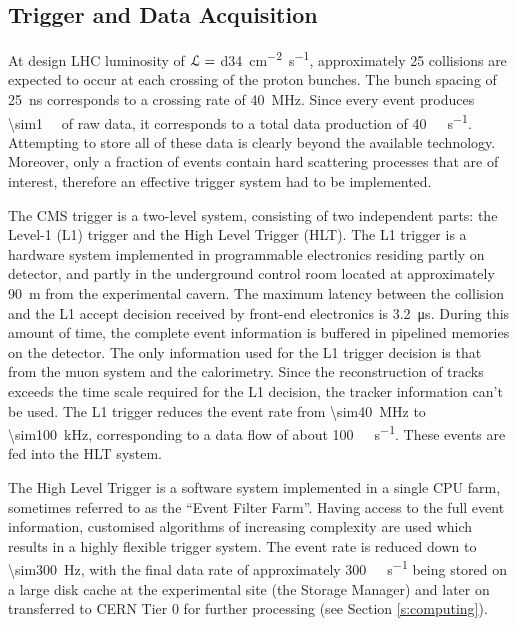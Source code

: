 \subsection{Trigger and Data Acquisition}
\label{ss:trigger_daq}
At design LHC luminosity of $\mathcal{L} = $ \SI{d34}{\cm^{-2} s^{-1}}, approximately \num{25} collisions are expected to
occur at each crossing of the proton bunches. The bunch spacing of \SI{25}{\ns} corresponds to a crossing rate of
\SI{40}{\mega\hertz}. Since every event produces \SI{\sim1}{\mega\byte} of raw data, it corresponds to a total data
production of \SI{40}{\tera\byte\per\second}. Attempting to store all of these data is clearly beyond the available
technology. Moreover, only a fraction of events contain hard scattering processes that are of interest, therefore an
effective trigger system had to be implemented.

The CMS trigger is a two-level system, consisting of two independent parts: the Level-1 (L1) trigger and the High Level
Trigger (HLT). The L1 trigger is a hardware system implemented in programmable electronics residing partly on detector,
and partly in the underground control room located at approximately \SI{90}{\metre} from the experimental cavern. The
maximum latency between the collision and the L1 accept decision received by front-end electronics is
\SI{3.2}{\micro\second}. During this amount of time, the complete event information is buffered in pipelined memories
on the detector. The only information used for the L1 trigger decision is that from the muon system and the calorimetry.
Since the reconstruction of tracks exceeds the time scale required for the L1 decision, the tracker information can't be
used. The L1 trigger reduces the event rate from \SI{\sim40}{\mega\hertz} to \SI{\sim100}{\kilo\hertz}, corresponding to
a data flow of about \SI{100}{\giga\byte\per\second}. These events are fed into the HLT system.

The High Level Trigger is a software system implemented in a single CPU farm, sometimes referred to as the ``Event
Filter Farm''. Having access to the full event information, customised algorithms of increasing complexity are used
which results in a highly flexible trigger system. The event rate is reduced down to \SI{\sim300}{\Hz}, with the final
data rate of approximately \SI{300}{\mega\byte\per\second} being stored on a large disk cache at the experimental site
(the Storage Manager) and later on transferred to CERN Tier 0 for further processing (see Section \ref{s:computing}).


